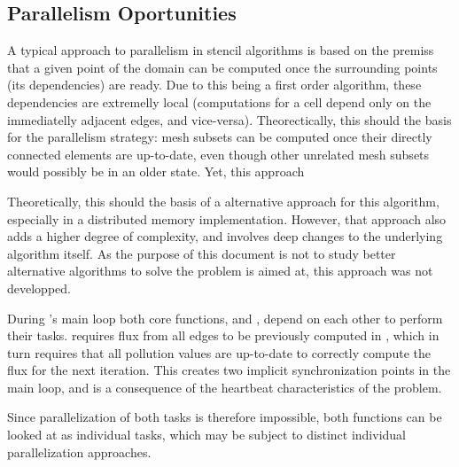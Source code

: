 \subsection{Parallelism Oportunities}
\label{sec:220}

A typical approach to parallelism in stencil algorithms is based on the premiss that a given point of the domain can be computed once the surrounding points (its dependencies) are ready.
Due to this being a first order algorithm, these dependencies are extremelly local (computations for a cell depend only on the immediatelly adjacent edges, and vice-versa).
Theorectically, this should the basis for the parallelism strategy: mesh subsets can be computed once their directly connected elements are up-to-date, even though other unrelated mesh subsets would possibly be in an older state.
Yet, this approach 



Theoretically, this should the basis of a alternative approach for this algorithm, especially in a distributed memory implementation. However, that approach also adds a higher degree of complexity, and involves deep changes to the underlying algorithm itself. As the purpose of this document is not to study better alternative algorithms to solve the problem \polu is aimed at, this approach was not developped.

During \polu's main loop both core functions, \computeflux and \update, depend on each other to perform their tasks. \update requires flux from all edges to be previously computed in \computeflux, which in turn requires that all pollution values are up-to-date to correctly compute the flux for the next iteration. This creates two implicit synchronization points in the main loop, and is a consequence of the heartbeat characteristics of the problem.

Since parallelization of both tasks is therefore impossible, both functions can be looked at as individual tasks, which may be subject to distinct individual parallelization approaches.
